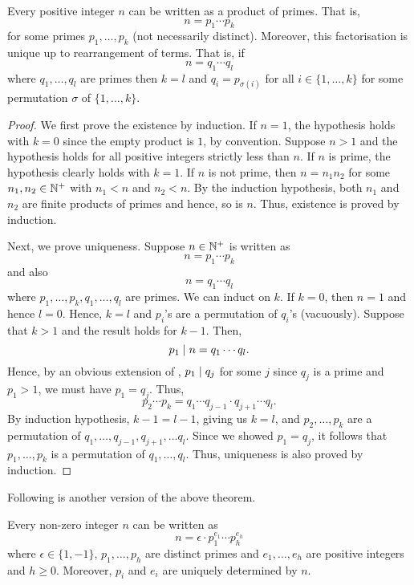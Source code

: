 \begin{theorem} \label{thm:FTAr}
    Every positive integer $n$ can be written as a product of primes. That is,
    \[
        n = p_1 \cdots p_k
    \]
    for some primes $p_1, \ldots, p_k$ (not necessarily distinct). Moreover, this factorisation is unique up to rearrangement of terms. That is, if
    \[
        n = q_1 \cdots q_l
    \]
    where $q_1, \ldots, q_l$ are primes then $k=l$ and $q_i = p_{\sigma(i)}$ for all $i \in \{1, \ldots, k\}$ for some permutation $\sigma$ of $\{1, \ldots, k\}$.
\end{theorem}
\begin{proof}
    We first prove the existence by induction. If $n=1$, the hypothesis holds with $k = 0$ since the empty product is $1$, by convention. Suppose $n > 1$ and the hypothesis holds for all positive integers strictly less than $n$. If $n$ is prime, the hypothesis clearly holds with $k=1$. If $n$ is not prime, then $n = n_1 n_2$ for some $n_1, n_2 \in \mathbb{N}^+$ with $n_1 < n$ and $n_2 < n$. By the induction hypothesis, both $n_1$ and $n_2$ are finite products of primes and hence, so is $n$. Thus, existence is proved by induction.
    
    Next, we prove uniqueness. Suppose $n \in \mathbb{N}^+$ is written as
    \[
        n = p_1 \cdots p_k
    \]
    and also
    \[
        n = q_1 \cdots q_l
    \]
    where $p_1, \ldots, p_k, q_1, \ldots, q_l$ are primes. We can induct on $k$. If $k = 0$, then $n = 1$ and hence $l = 0$. Hence, $k = l$ and $p_i$'s are a permutation of $q_i$'s (vacuously). Suppose that $k > 1$ and the result holds for $k-1$. Then,
    \[
        p_1 \mid n = q_1 \cdots q_l.
    \]
    Hence, by an obvious extension of , $p_1 \mid q_j$ for some $j$ since $q_j$ is a prime and $p_1 > 1$, we must have $p_1 = q_j$. Thus,
    \[
        p_2 \cdots p_k = q_1 \cdots q_{j-1} \cdot q_{j+1} \cdots q_l.
    \]
    By induction hypothesis, $k-1 = l-1$, giving us $k=l$, and $p_2, \ldots, p_k$ are a permutation of $q_1, \ldots, q_{j-1}, q_{j+1}, \ldots q_l$. Since we showed $p_1 = q_j$, it follows that $p_1, \ldots, p_k$ is a permutation of $q_1, \ldots, q_l$. Thus, uniqueness is also proved by induction.
\end{proof}
Following is another version of the above theorem.
\begin{theorem}  \label{thm:FTAr2}
    Every non-zero integer $n$ can be written as
    \[
        n = \epsilon \cdot p_1^{e_1} \cdots p_h^{e_h}
    \]
    where $\epsilon \in \{1,-1\}$, $p_1, \ldots, p_h$ are distinct primes and $e_1, \ldots, e_h$ are positive integers and $h \geq 0$. Moreover, $p_i$ and $e_i$ are uniquely determined by $n$.
\end{theorem}
